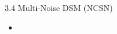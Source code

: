 \begin{frame}{3.4 Multi-Noise DSM (NCSN)}
    \begin{itemize}
        \item
    \end{itemize}
\end{frame}
